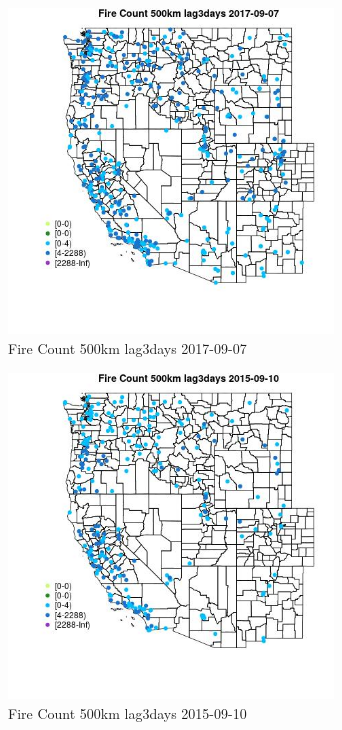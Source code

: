 \begin{figure} 
\centering  
\includegraphics[width=0.77\textwidth]{Code_Outputs/Report_ML_input_PM25_Step4_part_e_de_duplicated_aves_compiled_2019-05-21wNAs_MapObsFire_Count_500km_lag3days2017-09-07.jpg} 
\caption{\label{fig:Report_ML_input_PM25_Step4_part_e_de_duplicated_aves_compiled_2019-05-21wNAsMapObsFire_Count_500km_lag3days2017-09-07}Fire Count 500km lag3days 2017-09-07} 
\end{figure} 
 

\begin{figure} 
\centering  
\includegraphics[width=0.77\textwidth]{Code_Outputs/Report_ML_input_PM25_Step4_part_e_de_duplicated_aves_compiled_2019-05-21wNAs_MapObsFire_Count_500km_lag3days2015-09-10.jpg} 
\caption{\label{fig:Report_ML_input_PM25_Step4_part_e_de_duplicated_aves_compiled_2019-05-21wNAsMapObsFire_Count_500km_lag3days2015-09-10}Fire Count 500km lag3days 2015-09-10} 
\end{figure} 
 

